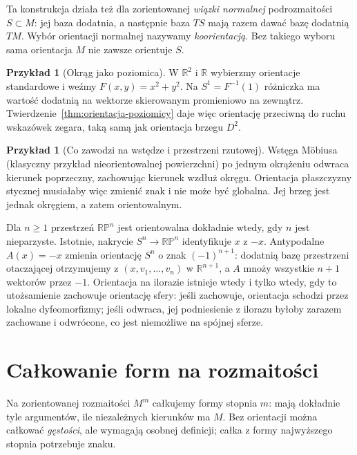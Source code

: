\documentclass[11pt,a4paper,oneside]{report}
\newcommand{\R}{\mathbb{R}}
\theoremstyle{plain}
\theoremstyle{definition}
\newtheorem{przyklad}[twierdzenie]{Przykład}
\theoremstyle{remark}
\begin{document}
Ta konstrukcja działa też dla zorientowanej
\emph{wiązki normalnej} podrozmaitości $S\subset M$:
jej baza dodatnia, a następnie baza $TS$ mają razem
dawać bazę dodatnią $TM$. Wybór orientacji normalnej
nazywamy \emph{koorientacją}. Bez takiego wyboru sama
orientacja $M$ nie zawsze orientuje $S$.

\begin{przyklad}[Okrąg jako poziomica]
W $\R^2$ i $\R$ wybierzmy orientacje standardowe
i weźmy $F(x,y)=x^2+y^2$. Na $S^1=F^{-1}(1)$
różniczka ma wartość dodatnią na wektorze
skierowanym promieniowo na zewnątrz.
Twierdzenie~\ref{thm:orientacja-poziomicy} daje więc
orientację przeciwną do ruchu wskazówek zegara,
taką samą jak orientacja brzegu $D^2$.
\end{przyklad}

\begin{przyklad}[Co zawodzi na wstędze i przestrzeni rzutowej]
Wstęga Möbiusa (klasyczny przykład nieorientowalnej powierzchni)
po jednym okrążeniu odwraca
kierunek poprzeczny, zachowując kierunek
wzdłuż okręgu. Orientacja płaszczyzny stycznej
musiałaby więc zmienić znak i nie może być globalna.
Jej brzeg jest jednak okręgiem, a zatem orientowalnym.

Dla $n\geq1$ przestrzeń $\mathbb{RP}^n$ jest
orientowalna dokładnie wtedy, gdy $n$ jest nieparzyste.
Istotnie, nakrycie $S^n\to\mathbb{RP}^n$ identyfikuje
$x$ z $-x$. Antypodalne $A(x)=-x$ zmienia orientację
$S^n$ o znak $(-1)^{n+1}$: dodatnią bazę przestrzeni otaczającej
otrzymujemy z $(x,v_1,\ldots,v_n)$ w $\R^{n+1}$,
a $A$ mnoży wszystkie $n+1$ wektorów przez $-1$.
Orientacja na ilorazie istnieje wtedy i tylko wtedy,
gdy to utożsamienie zachowuje orientację sfery:
jeśli zachowuje, orientacja schodzi przez lokalne
dyfeomorfizmy; jeśli odwraca, jej podniesienie z
ilorazu byłoby zarazem zachowane i odwrócone, co
jest niemożliwe na spójnej sferze.
\end{przyklad}
\section{Całkowanie form na rozmaitości}
\label{sec:formy-calkowanie}

Na zorientowanej rozmaitości $M^m$ całkujemy formy
stopnia $m$: mają dokładnie tyle argumentów, ile
niezależnych kierunków ma $M$. Bez orientacji można
całkować \emph{gęstości}, ale wymagają osobnej definicji;
całka z formy najwyższego stopnia potrzebuje znaku.
\end{document}
